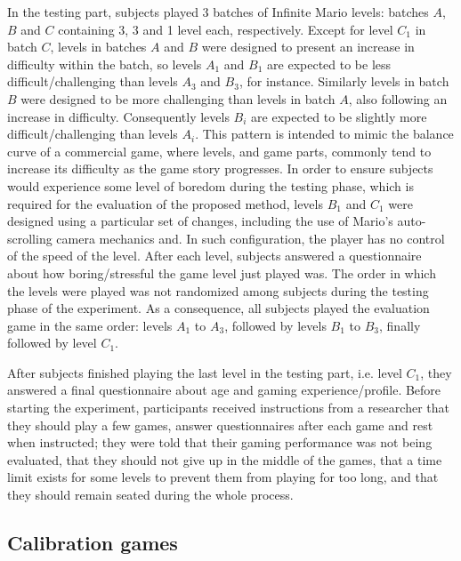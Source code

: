In the testing part, subjects played 3 batches of Infinite Mario levels: batches $A$, $B$ and $C$ containing 3, 3 and 1 level each, respectively. Except for level $C_1$ in batch $C$, levels in batches $A$ and $B$ were designed to present an increase in difficulty within the batch, so levels $A_1$ and $B_1$ are expected to be less difficult/challenging than levels $A_3$ and $B_3$, for instance. Similarly levels in batch $B$ were designed to be more challenging than levels in batch $A$, also following an increase in difficulty. Consequently levels $B_i$ are expected to be slightly more difficult/challenging than levels $A_i$. This pattern is intended to mimic the balance curve of a commercial game, where levels, and game parts, commonly tend to increase its difficulty as the game story progresses. In order to ensure subjects would experience some level of boredom during the testing phase, which is required for the evaluation of the proposed method, levels $B_1$ and $C_1$ were designed using a particular set of changes, including the use of Mario's auto-scrolling camera mechanics and. In such configuration, the player has no control of the speed of the level. After each level, subjects answered a questionnaire about how boring/stressful the game level just played was. The order in which the levels were played was not randomized among subjects during the testing phase of the experiment. As a consequence, all subjects played the evaluation game in the same order: levels $A_1$ to $A_3$, followed by levels $B_1$ to $B_3$, finally followed by level $C_1$.


After subjects finished playing the last level in the testing part, i.e. level $C_1$, they answered a final questionnaire about age and gaming experience/profile. Before starting the experiment, participants received instructions from a researcher that they should play a few games, answer questionnaires after each game and rest when instructed; they were told that their gaming performance was not being evaluated, that they should not give up in the middle of the games, that a time limit exists for some levels to prevent them from playing for too long, and that they should remain seated during the whole process.

\subsection{Calibration games}
\label{sec:experiment2-calibration-games}

